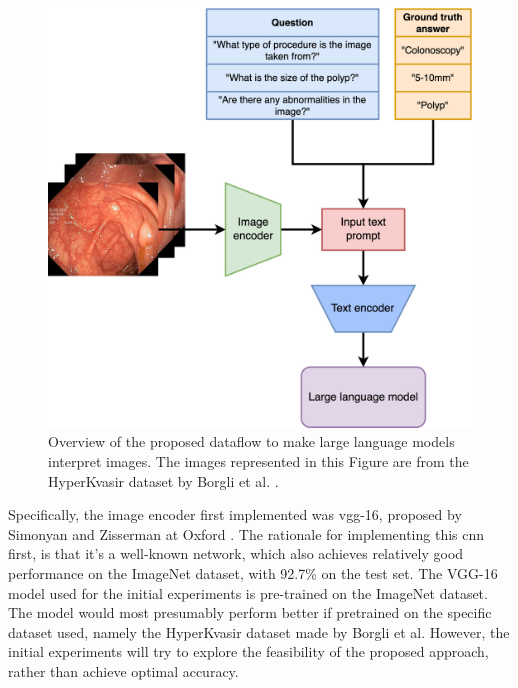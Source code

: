         \begin{figure}[htb]
            \centerline{
            \includegraphics[width=\textwidth]{images/alpaca_vision.png}}
            \caption[Overview of the proposed dataflow to make large language models interpret images.]{Overview of the proposed dataflow to make large language models interpret images. The images represented in this Figure are from the HyperKvasir dataset by Borgli et al. \cite{borgliHyperKvasirComprehensiveMulticlass2020}.}
            \label{fig:alpaca_vision}
        \end{figure}


        Specifically, the image encoder first implemented was \gls{vgg}-16, proposed by Simonyan and Zisserman at Oxford \cite{simonyanVeryDeepConvolutional2015}. The rationale for implementing this \gls{cnn} first, is that it’s a well-known network, which also achieves relatively good performance on the ImageNet dataset, with 92.7\% on the test set. The VGG-16 model used for the initial experiments is pre-trained on the ImageNet \cite{dengImageNetLargeScaleHierarchical2009} dataset. The model would most presumably perform better if pretrained on the specific dataset used, namely the HyperKvasir dataset \cite{borgliHyperKvasirComprehensiveMulticlass2020} made by Borgli et al. However, the initial experiments will try to explore the feasibility of the proposed approach, rather than achieve optimal accuracy.

